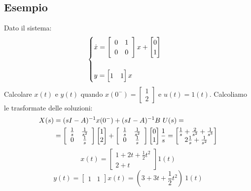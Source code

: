 \documentclass[../main.tex]{subfiles}
\begin{document}
	\subsection*{Esempio}
		Dato il sistema:
		\[\begin{cases}
			\dot x = \matTwo{0}{1}{0}{0} x + \left[ \begin{matrix} 0\\1 \end{matrix} \right]\\
			\smallskip\\
			y = \left[ \begin{matrix} 1 &1 \end{matrix} \right] x
		\end{cases} \]
		Calcolare $ x(t) $ e $ y(t) $ quando $ x(0^-) = \left[ \begin{matrix} 1\\ 2 \end{matrix} \right] $ e $ u(t) = 1(t) $.
		Calcoliamo le trasformate delle soluzioni:
		\begin{align*}
			X(s) &= (sI-A)^{-1} x(0^-) + (sI-A)^{-1} B\ U(s) =\\
			&= \left[ \begin{array}{cc} \frac{1}{s} & \frac{1}{s^2}\\ 0 & \frac{1}{s} \end{array} \right] \left[ \begin{matrix} 1\\ 2 \end{matrix} \right] + \left[ \begin{array}{cc} \frac{1}{s} & \frac{1}{s^2}\\ 0 & \frac{1}{s} \end{array} \right] \left[ \begin{matrix} 0\\1 \end{matrix} \right] \frac{1}{s} = \left[ \begin{matrix} \frac{1}{s}+\frac{2}{s^2}+\frac{1}{s^3}\\ 2\frac{1}{s}+\frac{1}{s^2} \end{matrix} \right] 
		\end{align*}
		\[ x(t) = \left[ \begin{matrix} 1+2t+\frac{1}{2}t^2\\ 2+t \end{matrix} \right] 1(t) \]
		\[ y(t) = \left[ \begin{matrix} 1 &1 \end{matrix} \right] x(t) = (3+3t+\frac{1}{2}t^2)\ 1(t) \]
\end{document}
